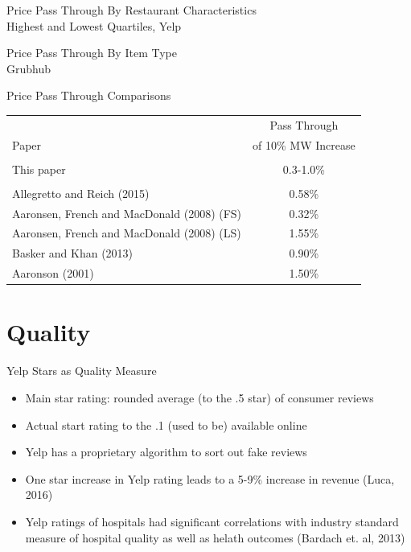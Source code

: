 \documentclass[xcolor=table]{beamer}
\newcommand\Wider[2][4em]{%
\makebox[\linewidth][c]{%
  \begin{minipage}{\dimexpr\textwidth+#1\relax}
  \raggedright#2
  \end{minipage}%
  }%
}
\begin{document}
\begin{spacing}{1.2}
\begin{frame}{Price Pass Through By Restaurant Characteristics \\ \large{Highest and Lowest Quartiles, Yelp}}
\centering
\tiny

\end{frame}



\begin{frame}{Price Pass Through By Item Type \\ \small{Grubhub}}
\Wider{
\centering
\tiny

}
\end{frame}


\begin{frame}{Price Pass Through Comparisons}
\centering
\small
\begin{tabular}{l c} \\ 
 & Pass Through  \\
Paper & of 10\% MW Increase \\ \hline \hline
\\
This paper & 0.3-1.0\% \\
\\
Allegretto and Reich (2015) & 0.58\% \\
Aaronsen, French and MacDonald (2008) (FS) &  0.32\%  \\
Aaronsen, French and MacDonald (2008) (LS) &  1.55\%  \\
Basker and Khan (2013) &  0.90\% \\
Aaronson (2001) & 1.50\% \\

\end{tabular}

\end{frame}


\section{Quality}


\begin{frame}{Yelp Stars as Quality Measure}
\begin{itemize}
\item Main star rating: rounded average (to the .5 star) of consumer reviews
\item Actual start rating to the .1 (used to be) available online
\item Yelp has a proprietary algorithm to sort out fake reviews
\item One star increase in Yelp rating leads to a 5-9\% increase in revenue (Luca, 2016)
\item Yelp ratings of hospitals had significant correlations with industry standard measure of hospital quality as well as helath outcomes (Bardach et. al, 2013)
\end{itemize}
\end{frame}


\end{spacing}
\end{document}
